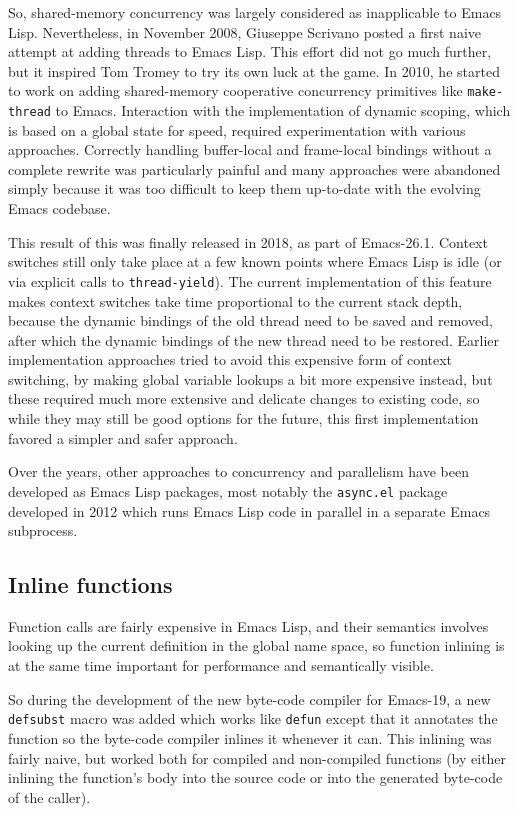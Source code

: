 \documentclass[format=acmsmall, review]{acmart}
\newcommand \Elisp {Emacs Lisp}
\begin{document}
So, shared-memory concurrency was largely considered as inapplicable to
\Elisp{}.  Nevertheless, in November 2008, Giuseppe Scrivano posted a first
naive attempt at adding threads to \Elisp{}.  This effort did not go much
further, but it inspired Tom Tromey to try its own luck at the game.
In 2010, he started to work on adding shared-memory cooperative concurrency
primitives like \texttt{make-thread} to Emacs.  Interaction with the
implementation of dynamic scoping, which is based on a global state for
speed, required experimentation with various approaches.  Correctly handling
buffer-local and frame-local bindings without a complete rewrite was
particularly painful and many approaches were abandoned simply because it
was too difficult to keep them up-to-date with the evolving Emacs codebase.

This result of this was finally released in 2018, as part of Emacs-26.1.
Context switches still only take place at a few known points where \Elisp{}
is idle (or via explicit calls to \texttt{thread-yield}).  The current
implementation of this feature makes context switches take time proportional
to the current stack depth, because the dynamic bindings of the old thread
need to be saved and removed, after which the dynamic bindings of the new
thread need to be restored.  Earlier implementation approaches tried to
avoid this expensive form of context switching, by making global variable
lookups a bit more expensive instead, but these required much more extensive
and delicate changes to existing code, so while they may still be good
options for the future, this first implementation favored a simpler and
safer approach.

Over the years, other approaches to concurrency and parallelism have been
developed as \Elisp{} packages, most notably the \texttt{async.el}
package~\cite{WiegleyAsync2019}
developed in 2012 which runs \Elisp{} code in parallel in a separate
Emacs subprocess.

\subsection{Inline functions}
\label{sec:inline-functions}

Function calls are fairly expensive in \Elisp{}, and their semantics
involves looking up the current definition in the global name space, so
function inlining is at the same time important for performance and
semantically visible.

So during the development of the new byte-code compiler for Emacs-19, a new
\texttt{defsubst} macro was added which works like \texttt{defun} except
that it annotates the function so the byte-code compiler inlines it whenever it
can.  This inlining was fairly naive, but worked both for compiled and
non-compiled functions (by either inlining the function's body into the
source code or into the generated byte-code of the caller).
\end{document}
